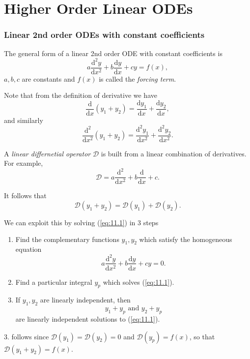 \documentclass[10pt]{article}
\begin{document}
    \part{Higher Order Linear ODEs}
    \section{Linear 2nd order ODEs with constant coefficients}
    The general form of a linear 2nd order ODE with constant coefficients is 
    \begin{equation}\label{eq:11.1}
        a \frac{\mathrm{d}^2y}{\mathrm{d}x^2}+b \frac{\mathrm{d}y}{\mathrm{d}x}+cy = f(x),
    \end{equation}
    $a,b,c$ are constants and $f(x)$ is called the \textit{forcing term}.

    Note that from the definition of derivative we have 
    \[
        \frac{\mathrm{d}}{\mathrm{d}x}(y_1+y_2)=\frac{\mathrm{d}y_1}{\mathrm{d}x}+\frac{\mathrm{d}y_2}{\mathrm{d}x},   
    \]
    and similarly
    \[
        \frac{\mathrm{d}^2}{\mathrm{d}x^2}(y_1+y_2)=\frac{\mathrm{d}^2y_1}{\mathrm{d}x^2}+\frac{\mathrm{d}^2y_2}{\mathrm{d}x^2}
    .\]

    \begin{definition}
        A \textit{linear differnetial operator} $ \mathcal{D} $ is built from a linear combination of derivatives. For example,
    \[
        \mathcal{D} = a\frac{\mathrm{d}^2}{\mathrm{d}x^2}+b \frac{\mathrm{d}}{\mathrm{d}x}+c.
    \]
    \end{definition}
    It follows that 
    \[
        \mathcal{D}(y_1+y_2)=\mathcal{D}(y_1)+\mathcal{D}(y_2)
    .\]

    We can exploit this by solving (\ref{eq:11.1}) in 3 steps
    \begin{enumerate}
        \item Find the complementary functions $y_1,y_2$ which satisfy the homogeneous equation
        \begin{equation}\label{eq:11.2}
            a \frac{\mathrm{d}^2y}{\mathrm{d}x^2}+b \frac{\mathrm{d}y}{\mathrm{d}x}+cy = 0.
        \end{equation}
        \item Find a particular integral $y_p$ which solves (\ref{eq:11.1}).
        \item If $y_1,y_2$ are linearly independent, then 
        \[y_1+y_p\text{ and }y_2+y_p\]
        are linearly independent solutions to (\ref{eq:11.1}).
    \end{enumerate}
    3. follows since $ \mathcal{D}(y_1)=\mathcal{D}(y_2)=0 $ and $ \mathcal{D}(y_p)=f(x) $, so that $ \mathcal{D}(y_1+y_2)=f(x) $.
\end{document}
